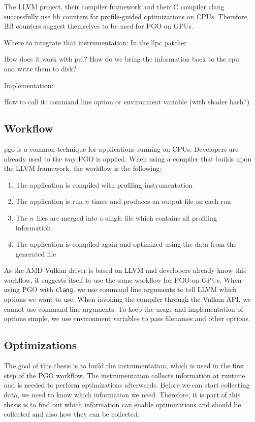 \clearpage
{}
The LLVM project, their compiler framework and their C compiler clang successfully use \gls{bb} counters for profile-guided optimizations on CPUs. Therefore BB counters suggest themselves to be used for PGO on GPUs.

Where to integrate that instrumentation: In the llpc patcher

How does it work with pal?
How do we bring the information back to the cpu and write them to disk?

Implementation:

How to call it: command line option or environment variable (with shader hash?)

\subsection{Workflow}
\label{sub:workflow}
\Gls{pgo} is a common technique for applications running on CPUs.
Developers are already used to the way PGO is applied.
When using a compiler that builds upon the LLVM framework, the workflow is the following:
\begin{enumerate}
	\item The application is compiled with profiling instrumentation
	\item The application is run $n$ times and produces an output file on each run
	\item The $n$ files are merged into a single file which contains all profiling information
	\item The application is compiled again and optimized using the data from the generated file
\end{enumerate}
As the AMD Vulkan driver is based on LLVM and developers already know this workflow, it suggests itself to use the same workflow for PGO on GPUs.
When using PGO with \texttt{clang}, we use command line arguments to tell LLVM which options we want to use. When invoking the compiler through the Vulkan API, we cannot use command line arguments.
To keep the usage and implementation of options simple, we use environment variables to pass filenames and other options.

\subsection{Optimizations}
The goal of this thesis is to build the instrumentation, which is used in the first step of the PGO workflow. The instrumentation collects information at runtime and is needed to perform optimizations afterwards. Before we can start collecting data, we need to know which information we need. Therefore, it is part of this thesis is to find out which information can enable optimizations and should be collected and also how they can be collected.

